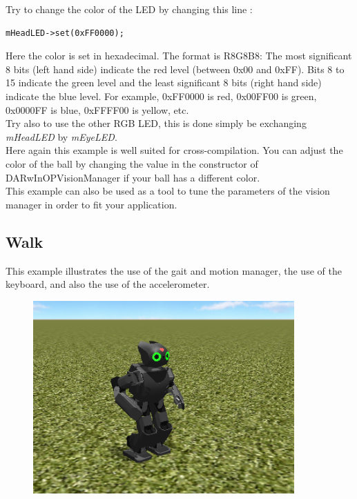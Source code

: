 \documentclass[a4paper, 12pt]{article}  		%
\begin{document}
Try to change the color of the LED by changing this line :
\lstset{language=c++} 
\lstset{commentstyle=\textit} 
\begin{lstlisting} 
mHeadLED->set(0xFF0000);
\end{lstlisting}
Here the color is set in hexadecimal. The format is R8G8B8: The most significant 8 bits (left hand side) indicate the red level (between 0x00 and 0xFF). Bits 8 to 15 indicate the green level and the least significant 8 bits (right hand side) indicate the blue level. For example, 0xFF0000 is red, 0x00FF00 is green, 0x0000FF is blue, 0xFFFF00 is yellow, etc.\\

Try also to use the other RGB LED, this is done simply be exchanging \textit{mHeadLED} by \textit{mEyeLED}.\\

Here again this example is well suited for cross-compilation. You can adjust the color of the ball by changing the value in the constructor of DARwInOPVisionManager if your ball has a different color.\\

This example can also be used as a tool to tune the parameters of the vision manager in order to fit your application.\\


\newpage
\subsection{Walk}

This example illustrates the use of the gait and motion manager, the use of the keyboard, and also the use of the accelerometer.\\

\begin{figure}[H]
\begin{center}
\includegraphics[width=10cm]{example_walk.png}
\label{example_walk.png}
\end{center}
\end{figure}
\end{document}
